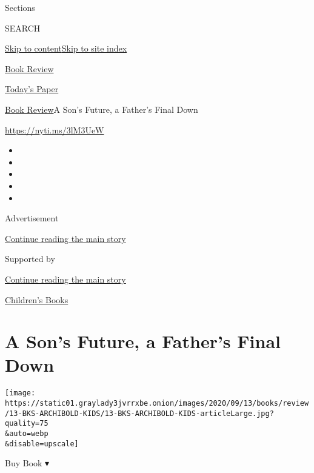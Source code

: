 Sections

SEARCH

\protect\hyperlink{site-content}{Skip to
content}\protect\hyperlink{site-index}{Skip to site index}

\href{https://www.nytimes3xbfgragh.onion/section/books/review}{Book
Review}

\href{https://myaccount.nytimes3xbfgragh.onion/auth/login?response_type=cookie\&client_id=vi}{}

\href{https://www.nytimes3xbfgragh.onion/section/todayspaper}{Today's
Paper}

\href{/section/books/review}{Book Review}\textbar{}A Son's Future, a
Father's Final Down

\url{https://nyti.ms/3lM3UeW}

\begin{itemize}
\item
\item
\item
\item
\item
\end{itemize}

Advertisement

\protect\hyperlink{after-top}{Continue reading the main story}

Supported by

\protect\hyperlink{after-sponsor}{Continue reading the main story}

\href{/column/childrens-books}{Children's Books}

\hypertarget{a-sons-future-a-fathers-final-down}{%
\section{A Son's Future, a Father's Final
Down}\label{a-sons-future-a-fathers-final-down}}

\texttt{[image: https://static01.graylady3jvrrxbe.onion/images/2020/09/13/books/review/13-BKS-ARCHIBOLD-KIDS/13-BKS-ARCHIBOLD-KIDS-articleLarge.jpg?quality=75\\\&auto=webp\\\&disable=upscale]}

Buy Book ▾

